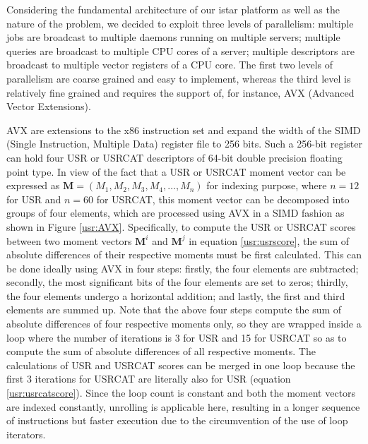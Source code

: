 Considering the fundamental architecture of our istar platform \citep{1362} as well as the nature of the problem, we decided to exploit three levels of parallelism: multiple jobs are broadcast to multiple daemons running on multiple servers; multiple queries are broadcast to multiple CPU cores of a server; multiple descriptors are broadcast to multiple vector registers of a CPU core. The first two levels of parallelism are coarse grained and easy to implement, whereas the third level is relatively fine grained and requires the support of, for instance, AVX (Advanced Vector Extensions).

AVX are extensions to the x86 instruction set and expand the width of the SIMD (Single Instruction, Multiple Data) register file to 256 bits. Such a 256-bit register can hold four USR or USRCAT descriptors of 64-bit double precision floating point type. In view of the fact that a USR or USRCAT moment vector can be expressed as $\mathbf M=(M_1, M_2, M_3, M_4, \ldots, M_n)$ for indexing purpose, where $n=12$ for USR and $n=60$ for USRCAT, this moment vector can be decomposed into groups of four elements, which are processed using AVX in a SIMD fashion as shown in Figure \ref{usr:AVX}. Specifically, to compute the USR or USRCAT scores between two moment vectors $\mathbf M^i$ and $\mathbf M^j$ in equation \eqref{usr:usrscore}, the sum of absolute differences of their respective moments must be first calculated. This can be done ideally using AVX in four steps: firstly, the four elements are subtracted; secondly, the most significant bits of the four elements are set to zeros; thirdly, the four elements undergo a horizontal addition; and lastly, the first and third elements are summed up. Note that the above four steps compute the sum of absolute differences of four respective moments only, so they are wrapped inside a loop where the number of iterations is 3 for USR and 15 for USRCAT so as to compute the sum of absolute differences of all respective moments. The calculations of USR and USRCAT scores can be merged in one loop because the first 3 iterations for USRCAT are literally also for USR (equation \eqref{usr:usrcatscore}). Since the loop count is constant and both the moment vectors are indexed constantly, unrolling is applicable here, resulting in a longer sequence of instructions but faster execution due to the circumvention of the use of loop iterators.

